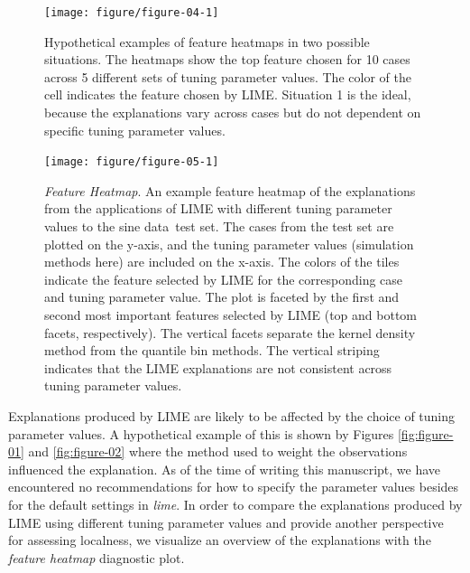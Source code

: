 \documentclass[AMS,STIX2COL]{WileyNJD-v2}\usepackage[]{graphicx}\usepackage[]{color}
\newenvironment{knitrout}{}{} %
\newcommand{\data}{sine data}
\begin{document}
\begin{figure}[!thp]
\begin{knitrout}
\color{fgcolor}

{\centering \texttt{[image: figure/figure-04-1]} 

}



\end{knitrout}
\caption{Hypothetical examples of feature heatmaps in two possible situations. The heatmaps show the top feature chosen for 10 cases across 5 different sets of tuning parameter values. The color of the cell indicates the feature chosen by LIME. Situation 1 is the ideal, because the explanations vary across cases but do not dependent on specific tuning parameter values.}
\label{fig:figure-04}

\vspace*{\floatsep}

\begin{knitrout}
\color{fgcolor}

{\centering \texttt{[image: figure/figure-05-1]} 

}



\end{knitrout}
\caption{\emph{Feature Heatmap}. An example feature heatmap of the explanations from the applications of LIME with different tuning parameter values to the \data \ test set. The cases from the test set are plotted on the y-axis, and the tuning parameter values (simulation methods here) are included on the x-axis. The colors of the tiles indicate the feature selected by LIME for the corresponding case and tuning parameter value. The plot is faceted by the first and second most important features selected by LIME (top and bottom facets, respectively). The vertical facets separate the  kernel density method from the quantile bin methods. The vertical striping indicates that the LIME explanations are not consistent across tuning parameter values.}
\label{fig:figure-05}
\end{figure}

Explanations produced by LIME are likely to be affected by the choice of tuning parameter values. A hypothetical example of this is shown by Figures \ref{fig:figure-01} and \ref{fig:figure-02} where the method used to weight the observations influenced the explanation. As of the time of writing this manuscript, we have encountered no recommendations for how to specify the parameter values besides for the default settings in \emph{lime}. In order to compare the explanations produced by LIME using different tuning parameter values and provide another perspective for assessing localness, we visualize an overview of the explanations with the \emph{feature heatmap} diagnostic plot. 
\end{document}
